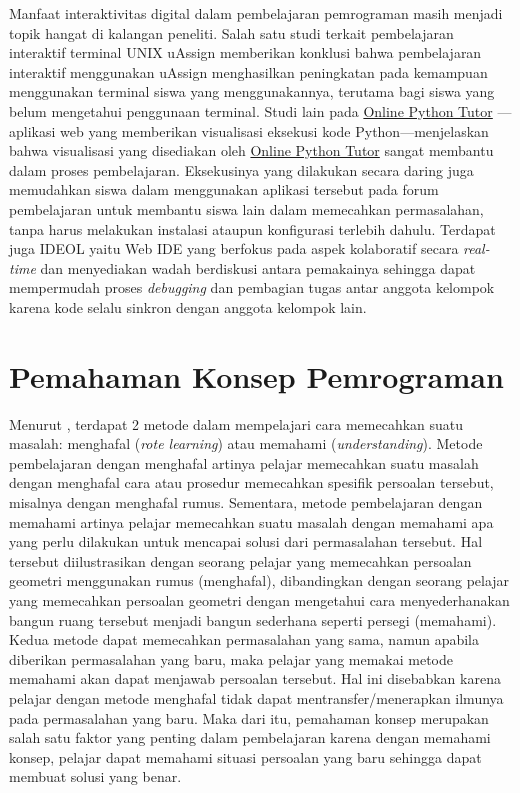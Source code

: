 Manfaat interaktivitas digital dalam pembelajaran pemrograman masih menjadi topik hangat di kalangan peneliti. Salah satu studi terkait pembelajaran interaktif terminal UNIX uAssign \parencite{bailey2019uassign} memberikan konklusi bahwa pembelajaran interaktif menggunakan uAssign menghasilkan peningkatan pada kemampuan menggunakan terminal siswa yang menggunakannya, terutama bagi siswa yang belum mengetahui  penggunaan terminal. Studi lain pada \href{https://pythontutor.com}{Online Python Tutor} \parencite{guo2013pythontutor}---aplikasi web yang memberikan visualisasi eksekusi kode Python---menjelaskan bahwa visualisasi yang disediakan oleh \href{https://pythontutor.com}{Online Python Tutor} sangat membantu dalam proses pembelajaran. Eksekusinya yang dilakukan secara daring juga memudahkan siswa dalam menggunakan aplikasi tersebut pada forum pembelajaran untuk membantu siswa lain dalam memecahkan permasalahan, tanpa harus melakukan instalasi ataupun konfigurasi terlebih dahulu. Terdapat juga IDEOL \parencite{tran2013interactive} yaitu Web IDE yang berfokus pada aspek kolaboratif secara \textit{real-time} dan menyediakan wadah berdiskusi antara pemakainya sehingga dapat mempermudah proses \textit{debugging} dan pembagian tugas antar anggota kelompok karena kode selalu sinkron dengan anggota kelompok lain.

\section{Pemahaman Konsep Pemrograman}
Menurut \textcite{mayer1981psychology}, terdapat 2 metode dalam mempelajari cara memecahkan suatu masalah: menghafal (\textit{rote learning}) atau memahami (\textit{understanding}). Metode pembelajaran dengan menghafal artinya pelajar memecahkan suatu masalah dengan menghafal cara atau prosedur memecahkan spesifik persoalan tersebut, misalnya dengan menghafal rumus. Sementara, metode pembelajaran dengan memahami artinya pelajar memecahkan suatu masalah dengan memahami apa yang perlu dilakukan untuk mencapai solusi dari permasalahan tersebut. Hal tersebut diilustrasikan dengan seorang pelajar yang memecahkan persoalan geometri menggunakan rumus (menghafal), dibandingkan dengan seorang pelajar yang memecahkan persoalan geometri dengan mengetahui cara menyederhanakan bangun ruang tersebut menjadi bangun sederhana seperti persegi (memahami). Kedua metode dapat memecahkan permasalahan yang sama, namun apabila diberikan permasalahan yang baru, maka pelajar yang memakai metode memahami akan dapat menjawab persoalan tersebut. Hal ini disebabkan karena pelajar dengan metode menghafal tidak dapat mentransfer/menerapkan ilmunya pada permasalahan yang baru. Maka dari itu, pemahaman konsep merupakan salah satu faktor yang penting dalam pembelajaran karena dengan memahami konsep, pelajar dapat memahami situasi persoalan yang baru sehingga dapat membuat solusi yang benar.

